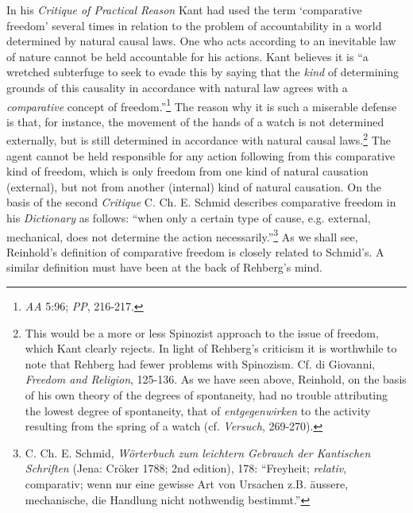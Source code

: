   In his \textit{Critique of Practical Reason} Kant had used the term `comparative freedom' several times in relation to the problem of accountability in a world determined by natural causal laws. One who acts according to an inevitable law of nature cannot be held accountable for his actions. Kant believes it is ``a wretched subterfuge to seek to evade this by saying that the \textit{kind} of determining grounds of this causality in accordance with natural law agrees with a \textit{comparative }concept of freedom.''\footnote{ \textit{AA} 5:96; \textit{PP}, 216{-}217.} The reason why it is such a miserable defense is that, for instance, the movement of the hands of a watch is not determined externally, but is still determined in accordance with natural causal laws.\footnote{ This would be a more or less Spinozist approach to the issue of freedom, which Kant clearly rejects. In light of Rehberg's criticism it is worthwhile to note that Rehberg had fewer problems with Spinozism. Cf. di Giovanni, \textit{Freedom and Religion}, 125{-}136. As we have seen above, Reinhold, on the basis of his own theory of the degrees of spontaneity, had no trouble attributing the lowest degree of spontaneity, that of \textit{entgegenwirken} to the activity resulting from the spring of a watch (cf. \textit{Versuch}, 269{-}270). } The agent cannot be held responsible for any action following from this comparative kind of freedom, which is only freedom from one kind of natural causation (external), but not from another (internal) kind of natural causation. On the basis of the second \textit{Critique} C. Ch. E. Schmid describes comparative freedom in his \textit{Dictionary }as follows: ``when only a certain type of cause, e.g. external, mechanical, does not determine the action necessarily.''\footnote{ C. Ch. E. Schmid, \textit{W\"{o}rterbuch zum leichtern Gebrauch der Kantischen Schriften} (Jena: Cr\"{o}ker 1788; 2nd edition), 178: ``Freyheit; \textit{relativ}, comparativ; wenn nur eine gewisse Art von Ursachen z.B. \"{a}ussere, mechanische, die Handlung nicht nothwendig bestimmt.'' } As we shall see, Reinhold's definition of comparative freedom is closely related to Schmid's. A similar definition must have been at the back of Rehberg's mind. 

